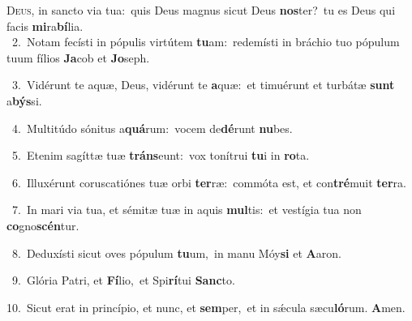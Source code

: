 \lettrine{\initial\textcolor{\initialcolor}{D}}{eus,} in sancto via tua:~\dagger quis Deus magnus sicut Deus \textbf{nos}\-ter?~\star tu es Deus qui facis \textbf{mi}\-ra\-\textbf{bí}\-lia.\\
{\numbfont\textcolor{\numbcolor}{~2.}}~Notam fecísti in pópulis virtútem \textbf{tu}\-am:~\star redemísti in bráchio tuo pópulum tuum fílios \textbf{Ja}\-cob et \textbf{Jo}\-seph.\par
{\numbfont\textcolor{\numbcolor}{~3.}}~Vidérunt te aquæ, Deus, vidérunt te \textbf{a}\-quæ:~\star et timuérunt et turbátæ \textbf{sunt} a\-\textbf{býs}\-si.\par
{\numbfont\textcolor{\numbcolor}{~4.}}~Multitúdo sónitus a\-\textbf{quá}\-rum:~\star vocem de\-\textbf{dé}\-runt \textbf{nu}\-bes.\par
{\numbfont\textcolor{\numbcolor}{~5.}}~Etenim sagíttæ tuæ \textbf{tráns}\-eunt:~\star vox tonítrui \textbf{tu}\-i in \textbf{ro}\-ta.\par
{\numbfont\textcolor{\numbcolor}{~6.}}~Illuxérunt coruscatiónes tuæ orbi \textbf{ter}\-ræ:~\star commóta est, et con\-\textbf{tré}\-muit \textbf{ter}\-ra.\par
{\numbfont\textcolor{\numbcolor}{~7.}}~In mari via tua, et sémitæ tuæ in aquis \textbf{mul}\-tis:~\star et vestígia tua non \textbf{co}\-gno\-\textbf{scén}\-tur.\par
{\numbfont\textcolor{\numbcolor}{~8.}}~Deduxísti sicut oves pópulum \textbf{tu}\-um,~\star in manu Móy\textbf{si} et \textbf{A}\-aron.\par
{\numbfont\textcolor{\numbcolor}{~9.}}~Glória Patri, et \textbf{Fí}\-lio,~\star et Spi\-\textbf{rí}\-tui \textbf{Sanc}\-to.\par
{\numbfont\textcolor{\numbcolor}{10.}}~Sicut erat in princípio, et nunc, et \textbf{sem}\-per,~\star et in sǽcula sæcu\-\textbf{ló}\-rum. \textbf{A}\-men.\par
